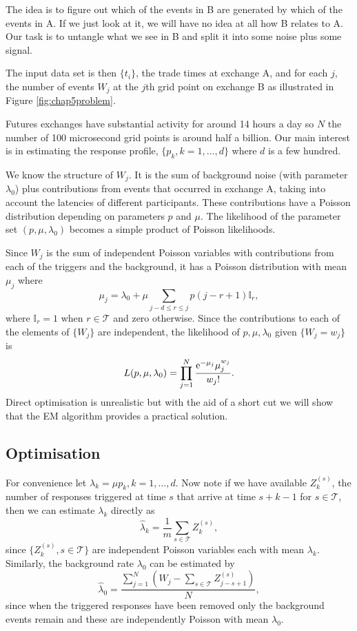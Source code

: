 The idea is to figure out which of the events in B are generated by which of the events in A. If we just look at it, we will have no idea at
all how B relates to A. Our task is to untangle what we see in B and split it into some noise plus some signal.

The input data set is then $\{t_i\}$, the trade times at exchange A, and for each $j$, the number of events $W_j$ at the $j$th grid point on exchange B as illustrated in Figure \ref{fig:chap5problem}.  

Futures exchanges have substantial activity for around 14 hours a day so $N$ the number of 100 microsecond grid points is around half a billion. Our main interest is in estimating the response profile, $\{p_k, k = 1,\dots,d\}$ where $d$ is a few hundred.

We know the structure of $W_j$.  It is the sum of background noise (with parameter $\lambda_0$) plus contributions from events that occurred in exchange A, taking into account the latencies of different participants. These contributions have a Poisson distribution depending on parameters $p$ and $\mu$.  The likelihood of the parameter set $(p, \mu, \lambda_0)$ becomes a simple product of Poisson likelihoods.  

Since $W_j$ is the sum of independent Poisson variables with contributions from each of the triggers and the background, it has a Poisson distribution with mean $\mu_j$  where
\begin{equation}
\label{eq:PoissonMean} 
\mu_j = \lambda_0  + \mu \sum_{j-d \leqslant r \leqslant j} p(j - r + 1)\mathbb{I}_r,
\end{equation}
where $\mathbb{I}_r = 1$ when $r \in \mathcal{T}$ and zero otherwise.  Since the contributions to each of the elements of $\{W_j\}$ are independent, the likelihood of $p,\mu, \lambda_0$ given $\{W_j = w_j\}$ is
\begin{equation}\label{eq:EMMLE}
L(p,\mu,\lambda_0) = \prod_{j=1}^N \frac{\text{\rm e}^{-\mu_j} \mu_j^{w_j}}{w_j!}.
\end{equation} 
Direct optimisation is unrealistic but with the aid of a short cut we will show that the EM algorithm provides a practical solution.

\subsection{Optimisation}
For convenience let $\lambda_k = \mu p_k, k =1,\dots,d$.  Now note if we have available $Z^{(s)}_k$, the number of responses triggered at time $s$ that arrive at time $s+k-1$ for $s \in \mathcal{T}$, then we can estimate $\lambda_k$ directly as
\begin{equation}\label{eq:lambdak} \hat{\lambda}_k = \frac{1}{m} \sum_{s \in \mathcal{T}} Z_k^{(s)},\end{equation}
since $\{Z^{(s)}_k, s \in \mathcal{T}\}$ are independent Poisson variables each with mean $\lambda_k$. Similarly, the background rate $\lambda_0$ can be estimated by
$$\hat{\lambda}_0 = \frac{\sum_{j=1}^N \left(W_j - \sum_{s \in \mathcal{T}} Z^{(s)}_{j-s+1}\right)}{N},$$
since when the triggered responses have been removed only the background events remain and these are independently Poisson with mean $\lambda_0$.


